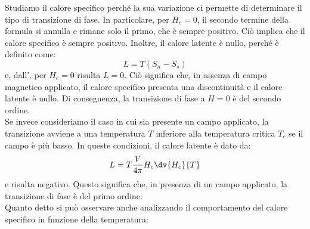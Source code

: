 Studiamo il calore specifico perché la sua variazione ci permette di determinare il tipo di transizione di fase. In particolare, per $H_c=0$, il secondo termine della formula si annulla e rimane solo il primo, che è sempre positivo. Ciò implica che il calore specifico è sempre positivo. Inoltre, il calore latente è nullo, perché è definito come:
\begin{equation*}
   L = T(S_n - S_s)
\end{equation*}
e, dall', per $H_c=0$ risulta $L = 0$. Ciò significa che, in assenza di campo magnetico applicato, il calore specifico presenta una discontinuità e il calore latente è nullo. Di conseguenza, la transizione di fase a $H = 0$ è del secondo ordine.\\
Se invece consideriamo il caso in cui sia presente un campo applicato, la transizione avviene a una temperatura $T$ inferiore alla temperatura critica $T_c$ se il campo è più basso. In queste condizioni, il calore latente è dato da:
\begin{equation*}
   L = T \frac{V}{4\pi} H_c \dv{H_c}{T}
\end{equation*}
e risulta negativo. Questo significa che, in presenza di un campo applicato, la transizione di fase è del primo ordine.\\
Quanto detto si può osservare anche analizzando il comportamento del calore specifico in funzione della temperatura:
